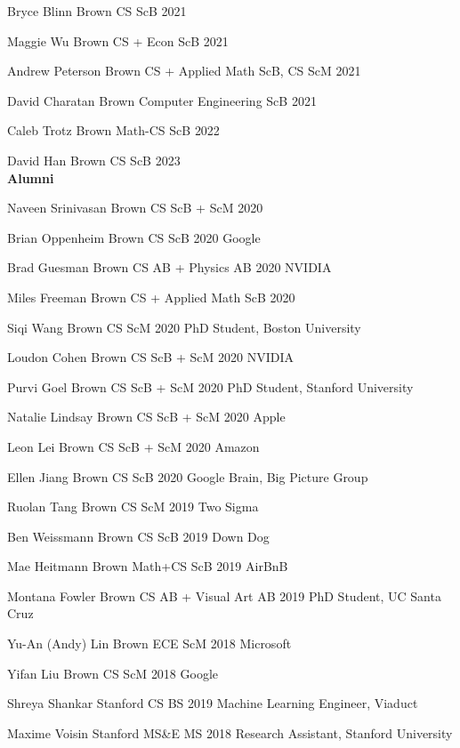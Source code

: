 \documentclass[line,margin]{res}
\begin{document}
\begin{resume}
\student
{Bryce Blinn}
{Brown CS ScB}
{2021}	

\student
{Maggie Wu}
{Brown CS + Econ ScB}
{2021}

\student
{Andrew Peterson}
{Brown CS + Applied Math ScB, CS ScM}
{2021}

\student
{David Charatan}
{Brown Computer Engineering ScB}
{2021}

\student
{Caleb Trotz}
{Brown Math-CS ScB}
{2022}

\student
{David Han}
{Brown CS ScB}
{2023}
\\


\textbf{Alumni}

\alumni
{Naveen Srinivasan}
{Brown CS ScB + ScM}
{2020}
{}

\alumni
{Brian Oppenheim}
{Brown CS ScB}
{2020}
{Google}

\alumni
{Brad Guesman}
{Brown CS AB + Physics AB}
{2020}
{NVIDIA}

\alumni
{Miles Freeman}
{Brown CS + Applied Math ScB}
{2020}
{}

\alumni
{Siqi Wang}
{Brown CS ScM}
{2020}
{PhD Student, Boston University}

\alumni
{Loudon Cohen}
{Brown CS ScB + ScM}
{2020}
{NVIDIA}

\alumni
{Purvi Goel}
{Brown CS ScB + ScM}
{2020}
{PhD Student, Stanford University}

\alumni
{Natalie Lindsay}
{Brown CS ScB + ScM}
{2020}
{Apple}

\alumni
{Leon Lei}
{Brown CS ScB + ScM}
{2020}
{Amazon}

\alumni
{Ellen Jiang}
{Brown CS ScB}
{2020}
{Google Brain, Big Picture Group}


\alumni
{Ruolan Tang}
{Brown CS ScM}
{2019}
{Two Sigma}

\alumni
{Ben Weissmann}
{Brown CS ScB}
{2019}
{Down Dog}

\alumni
{Mae Heitmann}
{Brown Math+CS ScB}
{2019}
{AirBnB}

\alumni
{Montana Fowler}
{Brown CS AB + Visual Art AB}
{2019}
{PhD Student, UC Santa Cruz}

\alumni
{Yu-An (Andy) Lin}
{Brown ECE ScM}
{2018}
{Microsoft}

\alumni
{Yifan Liu}
{Brown CS ScM}
{2018}
{Google}

\alumni
{Shreya Shankar}
{Stanford CS BS}
{2019}
{Machine Learning Engineer, Viaduct}

\alumni
{Maxime Voisin}
{Stanford MS\&E MS}
{2018}
{Research Assistant, Stanford University}


\end{resume}
\end{document}
